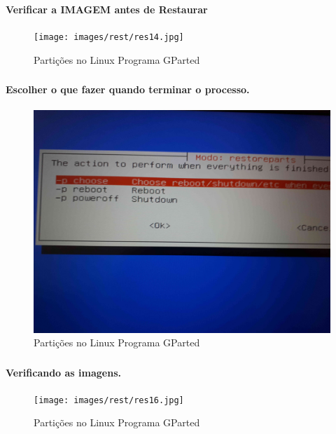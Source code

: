 \documentclass{beamer}
\begin{document}
\begin{frame}[plain,c]
   \frametitle{\insertsection}
    \framesubtitle{Verificar a IMAGEM antes de Restaurar}
    \begin{figure}[!h]
        \texttt{[image: images/rest/res14.jpg]}
        \caption{Partições no Linux Programa GParted}
    \end{figure}
\end{frame}	
	
	
\begin{frame}[plain,c]
   \frametitle{\insertsection}
    \framesubtitle{Escolher o que fazer quando terminar o processo.}
    \begin{figure}[!h]
        \includegraphics[width=1\linewidth]{images/rest/res15.jpg}
        \caption{Partições no Linux Programa GParted}
    \end{figure}
\end{frame}	
	
\begin{frame}[plain,c]
   \frametitle{\insertsection}
    \framesubtitle{Verificando as imagens.}
    \begin{figure}[!h]
        \texttt{[image: images/rest/res16.jpg]}
        \caption{Partições no Linux Programa GParted}
    \end{figure}
\end{frame}		
\end{document}
